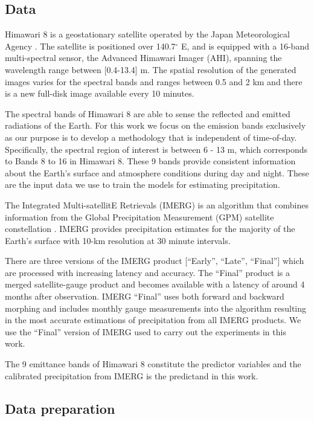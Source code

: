 \documentclass[3p,times]{elsarticle}
\begin{document}
\subsection{Data}

Himawari 8 is a geostationary satellite operated by the Japan Meteorological Agency \citep{bessho2016introduction}. The satellite is positioned over 140.7$^\circ$ E, and is equipped with a 16-band multi-spectral sensor, the Advanced Himawari Imager (AHI), spanning the wavelength range between [0.4-13.4] \textmu m. The spatial resolution of the generated images varies for the spectral bands and ranges between 0.5 and 2 km and there is a new full-disk image available every 10 minutes.

The spectral bands of Himawari 8 are able to sense the reflected and emitted radiations of the Earth. For this work we focus on the emission bands exclusively as our purpose is to develop a methodology that is independent of time-of-day. Specifically, the spectral region of interest is between 6 - 13 \textmu m, which corresponds to Bands 8 to 16 in Himawari 8. These 9 bands provide consistent information about the Earth's surface and atmosphere conditions during day and night. These are the input data we use to train the models for estimating precipitation.

The Integrated Multi-satellitE Retrievals (IMERG) is an algorithm that combines information from the Global Precipitation Measurement (GPM) satellite constellation \citep{huffman2015integrated}. IMERG provides precipitation estimates for the majority of the Earth's surface with 10-km resolution at 30 minute intervals.

There are three versions of the IMERG product [``Early'', ``Late'', ``Final''] which are processed with increasing  latency and accuracy. The ``Final'' product is a merged satellite-gauge product and becomes available with a latency of around 4 months after observation. IMERG ``Final'' uses both forward and backward morphing and includes monthly gauge measurements into the algorithm resulting in the most accurate estimations of precipitation from all IMERG products. We use the ``Final'' version of IMERG used to carry out the experiments in this work.

The 9 emittance bands of Himawari 8 constitute the predictor variables and the calibrated precipitation from IMERG is the predictand in this work.

\subsection{Data preparation}
\end{document}
